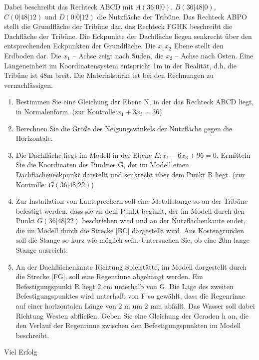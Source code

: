 \documentclass[a4paper,12pt]{article}
\begin{document}
\enlargethispage{2cm}

Dabei beschreibt das Rechteck ABCD mit
  $A (36|0|0)$, $ B (36|48|0)$, $C (0|48|12)$ und $ D (0|0|12) $
die Nutzfläche der Tribüne. Das Rechteck ABPO stellt die Grundfläche der Tribüne dar, das
Rechteck FGHK beschreibt die Dachfläche der Tribüne. Die Eckpunkte der Dachfläche liegen
senkrecht über den entsprechenden Eckpunkten der Grundfläche.
Die $x_1x_2 $  Ebene stellt den Erdboden dar. Die $ x_1$ – Achse zeigt nach Süden, die $x_2$ – Achse nach
Osten. Eine Längeneinheit im Koordinatensystem entspricht 1m in der Realität, d.h. die Tribüne ist
48m breit. Die Materialstärke ist bei den Rechnungen zu vernachlässigen.
\begin{enumerate}[label={\alph*)}]
\item  Bestimmen Sie eine Gleichung der Ebene N, in der das Rechteck ABCD liegt, in
Normalenform. (zur Kontrolle:$ x_1 + 3x_3 = 36 $)
\item Berechnen Sie die Größe des Neigungswinkels der Nutzfläche gegen die Horizontale.
\item Die Dachfläche liegt im Modell in der Ebene $E: x_1 - 6x_3 + 96 = 0.$
Ermitteln Sie die Koordinaten des Punktes G, der im Modell einen Dachflächeneckpunkt
darstellt und senkrecht über dem Punkt B liegt. (zur Kontrolle: $G (36|48|22)$)
\item Zur Installation von Lautsprechern soll eine Metallstange so an der Tribüne befestigt
werden, dass sie an dem Punkt beginnt, der im Modell durch den Punkt $G (36|48|22)$  beschrieben wird
und an der Nutzflächenkante endet, die im Modell durch die Strecke [BC] dargestellt wird.
Aus Kostengründen soll die Stange so kurz wie möglich sein. Untersuchen Sie, ob eine 20m
lange Stange ausreicht.
\item An der Dachflächenkante Richtung Spielstätte, im Modell dargestellt durch die Strecke
[FG], soll eine Regenrinne abgehängt werden. Ein Befestigungspunkt R liegt 2 cm
unterhalb von G. Die Lage des zweiten Befestigungspunktes wird unterhalb von F so
gewählt, dass die Regenrinne auf einer horizontalen Länge von 2 m um 2 mm abfällt. Das
Wasser soll dabei Richtung Westen abfließen. Geben Sie eine Gleichung der Geraden h an,
die den Verlauf der Regenrinne zwischen den Befestigungspunkten im Modell beschreibt.
\end{enumerate}
\vspace{0,8cm}


\centerline{Viel Erfolg}









\end{document}
